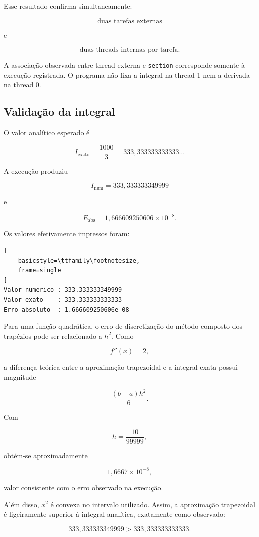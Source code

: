 Esse resultado confirma simultaneamente:

\[
\text{duas tarefas externas}
\]

e

\[
\text{duas threads internas por tarefa}.
\]

A associação observada entre thread externa e \texttt{section} corresponde
somente à execução registrada. O programa não fixa a integral na thread 1 nem
a derivada na thread 0.


\subsection{Validação da integral}

O valor analítico esperado é

\[
I_{\mathrm{exato}}
=
\frac{1000}{3}
=
333{,}333333333333\ldots
\]

A execução produziu

\[
I_{\mathrm{num}}
=
333{,}333333349999
\]

e

\[
E_{\mathrm{abs}}
=
1{,}666609250606\times10^{-8}.
\]

Os valores efetivamente impressos foram:

\begin{lstlisting}[
    basicstyle=\ttfamily\footnotesize,
    frame=single
]
Valor numerico : 333.333333349999
Valor exato    : 333.333333333333
Erro absoluto  : 1.666609250606e-08
\end{lstlisting}

Para uma função quadrática, o erro de discretização do método composto dos
trapézios pode ser relacionado a $h^2$. Como

\[
f''(x)=2,
\]

a diferença teórica entre a aproximação trapezoidal e a integral exata possui
magnitude

\[
\frac{(b-a)h^2}{6}.
\]

Com

\[
h=\frac{10}{99999},
\]

obtém-se aproximadamente

\[
1{,}6667\times10^{-8},
\]

valor consistente com o erro observado na execução.

Além disso, $x^2$ é convexa no intervalo utilizado. Assim, a aproximação
trapezoidal é ligeiramente superior à integral analítica, exatamente como
observado:

\[
333{,}333333349999
>
333{,}333333333333.
\]


